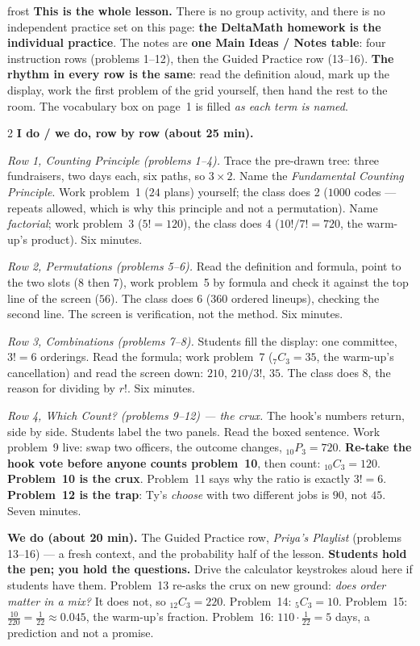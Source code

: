 \documentclass[10pt]{article}
\newcommand{\Pnr}[2]{{}_{#1}P_{#2}}
\newcommand{\Cnr}[2]{{}_{#1}C_{#2}}
\begin{document}
\boxguard
\begin{skillbox}{frost}
\textbf{This is the whole lesson.} There is no group activity, and there is no independent
practice set on this page: \textbf{the DeltaMath homework is the individual practice}. The notes are
\textbf{one Main Ideas / Notes table}: four instruction rows (problems 1--12), then the Guided
Practice row (13--16). \textbf{The rhythm in every row is the same}: read the definition aloud,
mark up the display, work the first problem of the grid yourself, then hand the rest to the
room. The vocabulary box on page~1 is filled \emph{as each term is named}.
\begin{multicols}{2}
\textbf{I do / we do, row by row (about 25 min).}

\emph{Row 1, Counting Principle (problems 1--4).} Trace the pre-drawn tree: three fundraisers,
two days each, six paths, so $3 \times 2$. Name the \emph{Fundamental Counting Principle}.
Work problem~1 ($24$ plans) yourself; the class does 2 ($1000$ codes --- repeats allowed,
which is why this principle and not a permutation). Name \emph{factorial}; work problem~3
($5! = 120$), the class does 4 ($10!/7! = 720$, the warm-up's product). Six minutes.

\emph{Row 2, Permutations (problems 5--6).} Read the definition and formula, point to the two
slots ($8$ then $7$), work problem~5 by formula and check it against the top line of the screen
($56$). The class does 6 ($360$ ordered lineups), checking the second line. The screen is
verification, not the method. Six minutes.

\emph{Row 3, Combinations (problems 7--8).} Students fill the display: one committee, $3! = 6$
orderings. Read the formula; work problem~7 ($\Cnr{7}{3} = 35$, the warm-up's cancellation)
and read the screen down: $210$, $210/3!$, $35$. The class does 8, the reason for dividing by
$r!$. Six minutes.

\emph{Row 4, Which Count? (problems 9--12) --- the crux.} The hook's numbers return, side by
side. Students label the two panels. Read the boxed sentence. Work problem~9 live: swap two
officers, the outcome changes, $\Pnr{10}{3} = 720$. \textbf{Re-take the hook vote before
anyone counts problem~10}, then count: $\Cnr{10}{3} = 120$. \textbf{Problem~10 is the crux}.
Problem~11 says why the ratio is exactly $3! = 6$. \textbf{Problem~12 is the trap}: Ty's
\emph{choose} with two different jobs is $90$, not $45$. Seven minutes.

\columnbreak
\textbf{We do (about 20 min).} The Guided Practice row, \emph{Priya's Playlist} (problems
13--16) --- a fresh context, and the probability half of the lesson. \textbf{Students hold the
pen; you hold the questions.} Drive the calculator keystrokes aloud here if students have
them. Problem~13 re-asks the crux on new ground: \emph{does order matter in a mix?} It does
not, so $\Cnr{12}{3} = 220$. Problem~14: $\Cnr{5}{3} = 10$. Problem~15: $\frac{10}{220} =
\frac{1}{22} \approx 0.045$, the warm-up's fraction. Problem~16: $110 \cdot \frac{1}{22} = 5$
days, a prediction and not a promise.


\end{multicols}
\end{skillbox}
\end{document}
